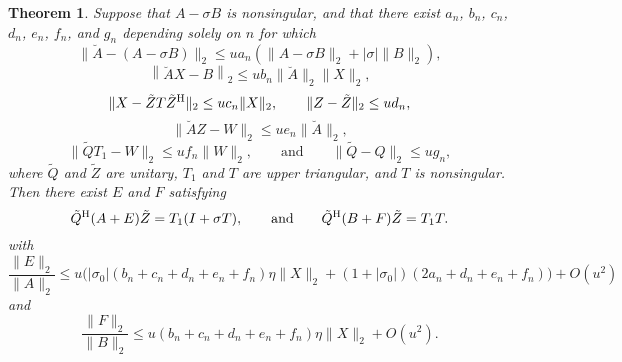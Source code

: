\documentclass[12pt]{article}
\def\eqand{\qquad\mbox{and}\qquad}
\def\H{{\rm H}}
\newtheorem{theorem}{Theorem}
\begin{document}
\begin{theorem}
  \label{th:generalized_schur}
  Suppose that $A-\sigma B$ is nonsingular, and that there exist
  $a_n$, $b_n$, $c_n$, $d_n$, $e_n$, $f_n$, and $g_n$ depending solely
  on $n$ for which
  \begin{equation}
    \|\breve{A} - (A-\sigma B)\|_2 \leq u a_n (\|A-\sigma B\|_2 + |\sigma| \|B\|_2),
  \end{equation}
  \begin{equation}
    \label{eq:Xerror}
    \left\| \breve{A} X - B \right\|_2 
    \leq u b_n \|\breve{A}\|_2\|X\|_2,
  \end{equation}
  \begin{equation}
    \label{eq:schur_error}
    \| X - \tilde{Z} T \tilde{Z}^\H \|_2 \leq u c_n \|X\|_2,\qquad
    \|Z - \tilde{Z}\|_2 \leq u d_n,
  \end{equation}
  \begin{equation}
    \label{eq:AZerror}
    \|\breve{A} Z - W\|_2 \leq u e_n \|\breve{A}\|_2,
  \end{equation}
  \begin{equation}
    \label{eq:QRerror}
    \|\tilde{Q}T_1 - W\|_2 \leq u f_n \|W\|_2, \eqand
    \|\tilde{Q} - Q\|_2 \leq ug_n ,
  \end{equation}
  where $\tilde{Q}$ and $\tilde{Z}$ are unitary, $T_1$ and $T$ are
  upper triangular, and $T$ is nonsingular.  Then there exist $E$ and
  $F$ satisfying
  \begin{equation*}
    \tilde{Q}^\H (A+E) \tilde{Z} = T_1(I+\sigma T),\eqand \tilde{Q}^\H (B+F) \tilde{Z}
    = T_1 T.
  \end{equation*}
  with
  \begin{equation*}
    \frac{\|E\|_2}{\|A\|_2} \leq
    u \Big(|\sigma_0| (b_n + c_n + d_n + e_n + f_n) \eta \|X\|_2 + (1+|\sigma_0|)(2a_n + d_n+e_n+f_n)\Big) +O(u^2)    
  \end{equation*}
  and
  \begin{equation*}
    \frac{\|F\|_2}{\|B\|_2} \leq
    u \left( b_n + c_n +d_n +e_n + f_n\right) \eta \|X\|_2 + O(u^2).
  \end{equation*}
\end{theorem}
\end{document}
